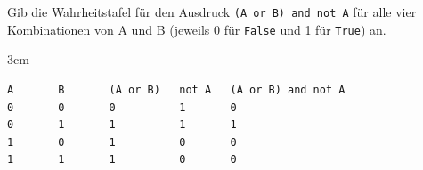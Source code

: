\question[4]
Gib die Wahrheitstafel für den Ausdruck \texttt{(A or B) and not A} für alle vier
Kombinationen von A und B (jeweils 0 für \texttt{False} und 1 für \texttt{True}) an.

\begin{solutionbox}{3cm}
\begin{lstlisting}
A       B       (A or B)   not A   (A or B) and not A
0       0       0          1       0
0       1       1          1       1
1       0       1          0       0
1       1       1          0       0
\end{lstlisting}
\end{solutionbox}